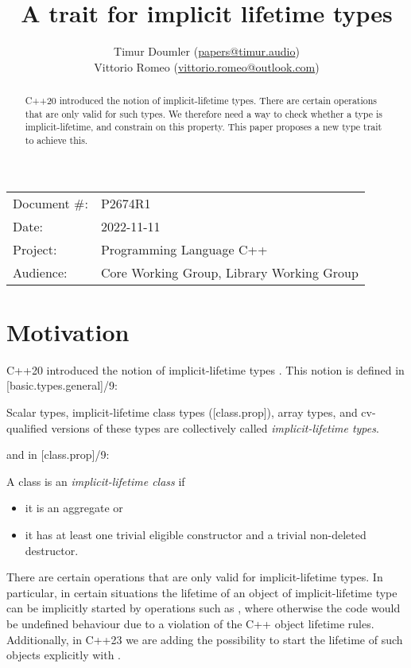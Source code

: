 


\title{A trait for implicit lifetime types}
\author{ Timur Doumler \small(\href{mailto:papers@timur.audio}{papers@timur.audio})  \\ Vittorio Romeo \small(\href{mailto:vittorio.romeo@outlook.com}{vittorio.romeo@outlook.com}) }
\date{}
\maketitle

\begin{tabular}{ll}
Document \#: & P2674R1 \\
Date: &2022-11-11 \\
Project: & Programming Language C++ \\
Audience: & Core Working Group, Library Working Group
\end{tabular}

\begin{abstract}
C++20 introduced the notion of implicit-lifetime types. There are certain operations that are only valid for such types. We therefore need a way to check whether a type is implicit-lifetime, and constrain on this property. This paper proposes a new type trait  to achieve this.
\end{abstract}

\section{Motivation}
\label{sec:motivation}

C++20 introduced the notion of implicit-lifetime types \cite{P0593R6}. This notion is defined in [basic.types.general]/9:

\begin{adjustwidth}{0.5cm}{0.5cm}
Scalar types, implicit-lifetime class types ([class.prop]), array types, and cv-qualified versions of these types are collectively called \emph{implicit-lifetime types}.
\end{adjustwidth}

and in [class.prop]/9:

\begin{adjustwidth}{0.5cm}{0.5cm}
A class  is an \emph{implicit-lifetime class} if 
\begin{itemize}
\item it is an aggregate or
\item it has at least one trivial eligible constructor and a trivial non-deleted destructor.
\end{itemize}
\end{adjustwidth}
There are certain operations that are only valid for implicit-lifetime types. In particular, in certain situations the lifetime of an object of implicit-lifetime type can be implicitly started by operations such as , where otherwise the code would be undefined behaviour due to a violation of the C++ object lifetime rules. Additionally, in C++23 we are adding the possibility to start the lifetime of such objects explicitly with  \cite{P2590R2}.

